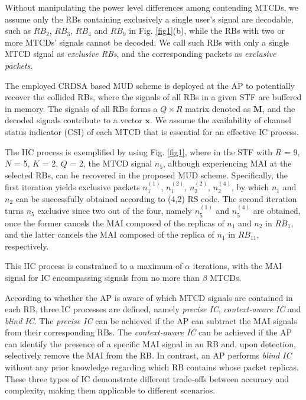 \documentclass[a4paper]{IEEEtran}
\begin{document}
Without manipulating the power level differences among contending MTCDs, we assume only the RBs containing exclusively a single user's signal are decodable, such as $RB_2$, $RB_3$, $RB_4$ and $RB_{9}$ in Fig. \ref{fig1}(b), while the RBs with two or more MTCDs' signals cannot be decoded. We call such RBs with only a single MTCD signal as \emph{exclusive RBs}, and the corresponding packets as \emph{exclusive packets}.

The employed CRDSA based MUD scheme is deployed at the AP to potentially recover the collided RBs, where the signals of all RBs in a given STF are buffered in memory. The signals of all RBs forms a $Q \times R$ matrix denoted as $\mathbf{M}$, and the decoded signals contribute to a vector $\pmb{x}$. We assume the availability of channel status indicator (CSI) of each MTCD that is essential for an effective IC process.

The IIC process is exemplified by using Fig. \ref{fig1}, where in the STF with $R$ = 9, $N$ = 5, $K$ = 2, $Q$ = 2, the MTCD signal $n_5$, although experiencing MAI at the selected RBs, can be recovered in the proposed MUD scheme. Specifically, the first iteration yields exclusive packets $n^{(1)}_1$, $n^{(2)}_1$, $n^{(2)}_2$, $n^{(4)}_2$, by which $n_1$ and $n_2$ can be successfully obtained according to (4,2) RS code. The second iteration turns $n_5$ exclusive since two out of the four, namely $n^{(1)}_5$ and $n^{(4)}_5$ are obtained, once the former cancels the MAI composed of the replicas of $n_1$ and $n_2$ in $RB_1$, and the latter cancels the MAI composed of the replica of $n_1$ in $RB_{11}$, respectively.  

This IIC process is constrained to a maximum of $\alpha$ iterations, with the MAI signal for IC encompassing signals from no more than $\beta$ MTCDs. 

According to whether the AP is aware of which MTCD signals are contained in each RB, three IC processes are defined, namely \textit{precise IC}, \textit{context-aware IC} and \textit{blind IC}. The \textit{precise IC} can be achieved if the AP can subtract the MAI signals from their corresponding RBs. The \textit{context-aware IC} can be achieved if the AP can identify the presence of a specific MAI signal in an RB and, upon detection, selectively remove the MAI from the RB. In contrast, an AP performs \textit{blind IC} without any prior knowledge regarding which RB contains whose packet replicas. These three types of IC demonstrate different trade-offs between accuracy and complexity, making them applicable to different scenarios.
\end{document}
